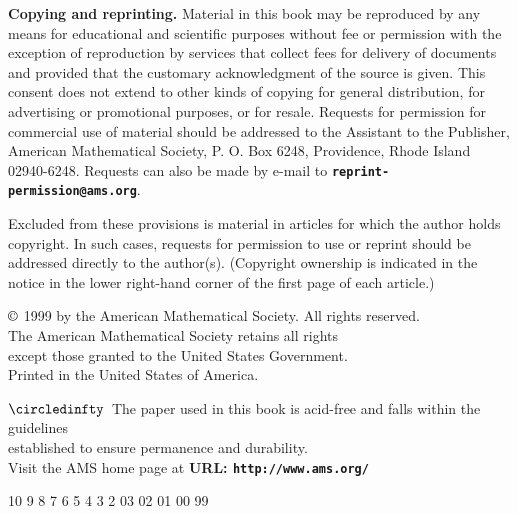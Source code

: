 \begin{copyrightpage}
\noindent \textbf{Copying and reprinting.} Material in this book may
be reproduced by any means for educational and scientific purposes
without fee or permission with the exception of reproduction by
services that collect fees for delivery of documents and provided
that the customary acknowledgment of the source is given. This
consent does not extend to other kinds of copying for general
distribution, for advertising or promotional purposes, or for
resale. Requests for permission for commercial use of material
should be addressed to the Assistant to the Publisher, American
Mathematical Society, P. O. Box 6248, Providence, Rhode Island
02940-6248. Requests can also be made by e-mail to
\textbf{\texttt{reprint-permission@ams.org}}.

Excluded from these provisions is material in articles for which the
author holds copyright. In such cases, requests for permission to
use or reprint should be addressed directly to the author(s).
(Copyright ownership is indicated in the notice in the lower
right-hand corner of the first page of each article.)

\begin{center}
$\copyright$ 1999 by the American Mathematical Society. All rights reserved.\\
The American Mathematical Society retains all rights\\
except those granted to the United States Government.\\
Printed in the United States of America.
\end{center}

\begin{center}
$\circledinfty$\ The paper used in this book is acid-free and falls within the guidelines\\
established to ensure permanence and durability.\\
Visit the AMS home page at \textbf{URL:
\texttt{http://www.ams.org/}}
\end{center}

\begin{center}
10 9 8 7 6 5 4 3 2  03 02 01 00 99
\end{center}
\end{copyrightpage}
